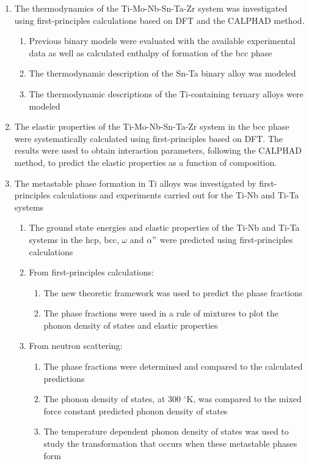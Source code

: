 \begin{enumerate}
	\item The thermodynamics of the Ti-Mo-Nb-Sn-Ta-Zr system was investigated using first-principles calculations based on DFT and the CALPHAD method. 
	\begin{enumerate}
		\item Previous binary models were evaluated with the available experimental data as well as calculated enthalpy of formation of the bcc phase 
		\item The thermodynamic description of the Sn-Ta binary alloy was modeled
		\item The thermodynamic descriptions of the Ti-containing ternary alloys were modeled
	\end{enumerate}
	\item The elastic properties of the Ti-Mo-Nb-Sn-Ta-Zr system in the bcc phase were systematically calculated using first-principles based on DFT. The results were used to obtain interaction parameters, following the CALPHAD method, to predict the elastic properties as a function of composition. 
	\item The metastable phase formation in Ti alloys was investigated by first-principles calculations and experiments carried out for the Ti-Nb and Ti-Ta systems
	\begin{enumerate}
		\item The ground state energies and elastic properties of the Ti-Nb and Ti-Ta systems in the hcp, bcc, $\omega$ and $\alpha"$ were predicted using first-principles calculations
		\item From first-principles calculations:
			\begin{enumerate}
			\item The new theoretic framework was used to predict the phase fractions
			\item The phase fractions were used in a rule of mixtures to plot the phonon density of states and elastic properties
		\end{enumerate}
		\item From neutron scattering:
		\begin{enumerate}
			\item The phase fractions were determined and compared to the calculated predictions
			\item The phonon density of states, at 300 $^\circ$K, was compared to the mixed force constant predicted phonon density of states 
			\item The temperature dependent phonon density of states was used to study the transformation that occurs when these metastable phases form
		\end{enumerate}
	\end{enumerate} 
\end{enumerate}

